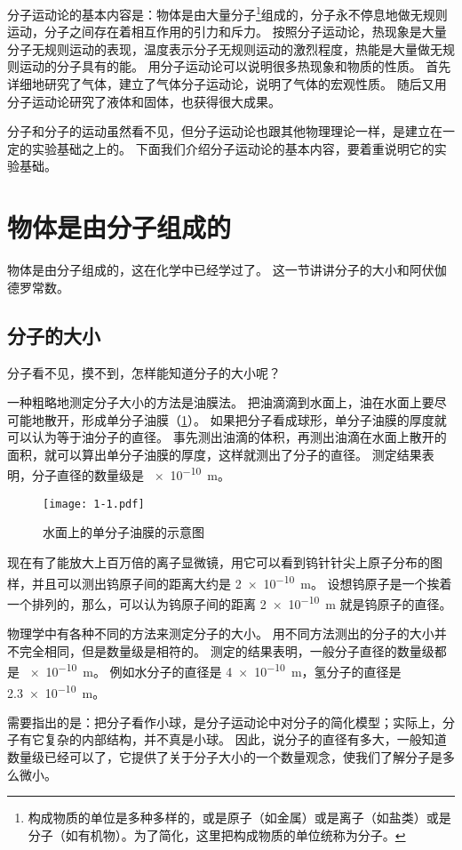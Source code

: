 分子运动论的基本内容是：物体是由大量分子\footnote{构成物质的单位是多种多样的，或是原子（如金属）或是离子（如盐类）或是分子（如有机物）。为了简化，这里把构成物质的单位统称为分子。}组成的，分子永不停息地做无规则运动，分子之间存在着相互作用的引力和斥力。
按照分子运动论，热现象是大量分子无规则运动的表现，温度表示分子无规则运动的激烈程度，热能是大量做无规则运动的分子具有的能。
用分子运动论可以说明很多热现象和物质的性质。
首先详细地研究了气体，建立了气体分子运动论，说明了气体的宏观性质。
随后又用分子运动论研究了液体和固体，也获得很大成果。

分子和分子的运动虽然看不见，但分子运动论也跟其他物理理论一样，是建立在一定的实验基础之上的。
下面我们介绍分子运动论的基本内容，要着重说明它的实验基础。

\section{物体是由分子组成的}
物体是由分子组成的，这在化学中已经学过了。
这一节讲讲分子的大小和阿伏伽德罗常数。

\subsection{分子的大小}
分子看不见，摸不到，怎样能知道分子的大小呢？

一种粗略地测定分子大小的方法是油膜法。
把油滴滴到水面上，油在水面上要尽可能地散开，形成单分子油膜（\cref{fig:1-1}）。
如果把分子看成球形，单分子油膜的厚度就可以认为等于油分子的直径。
事先测出油滴的体积，再测出油滴在水面上散开的面积，就可以算出单分子油膜的厚度，这样就测出了分子的直径。
测定结果表明，分子直径的数量级是 \qty{e-10}{m}。

\begin{figure}
  \texttt{[image: 1-1.pdf]}
  \caption{水面上的单分子油膜的示意图}\label{fig:1-1}
\end{figure}

现在有了能放大上百万倍的离子显微镜，用它可以看到钨针针尖上原子分布的图样，并且可以测出钨原子间的距离大约是 \qty{2e-10}{m}。
设想钨原子是一个挨着一个排列的，那么，可以认为钨原子间的距离 \qty{2e-10}{m} 就是钨原子的直径。

物理学中有各种不同的方法来测定分子的大小。
用不同方法测出的分子的大小并不完全相同，但是数量级是相符的。
测定的结果表明，一般分子直径的数量级都是 \qty{e-10}{m}。
例如水分子的直径是 \qty{4e-10}{m}，氢分子的直径是 \qty{2.3e-10}{m}。

需要指出的是：把分子看作小球，是分子运动论中对分子的简化模型；实际上，分子有它复杂的内部结构，并不真是小球。
因此，说分子的直径有多大，一般知道数量级已经可以了，它提供了关于分子大小的一个数量观念，使我们了解分子是多么微小。

